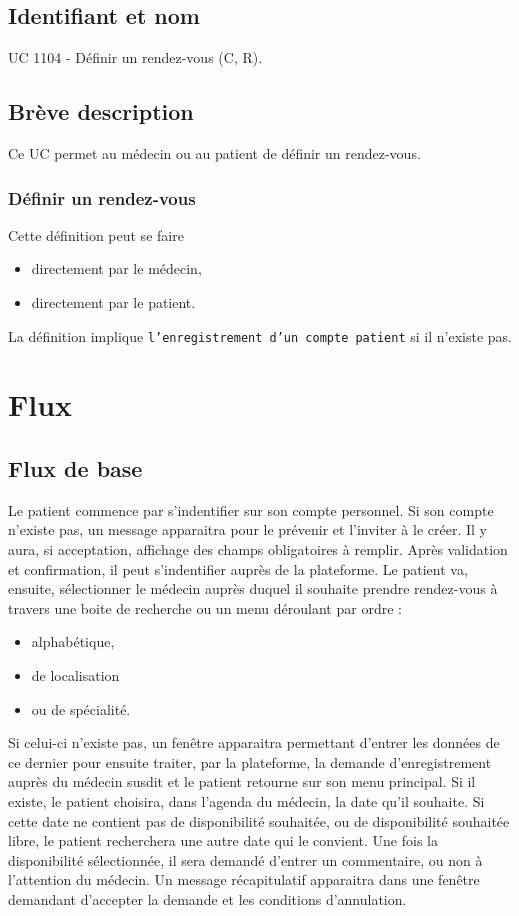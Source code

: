 \subsection{Identifiant et nom}
UC 1104 - Définir un rendez-vous (C, R).
\subsection{Brève description}
Ce UC permet au médecin ou au patient de définir un rendez-vous.
\subsubsection{Définir un rendez-vous}
Cette définition peut se faire
\begin{itemize}
	\item directement par le médecin,
	\item directement par le patient.
\end{itemize}

La définition implique \texttt{l'enregistrement d'un compte patient} si il n'existe pas.
\newpage

\section{Flux}
\subsection{Flux de base}
Le patient commence par s'indentifier sur son compte personnel. 
Si son compte n'existe pas, un message apparaitra pour le prévenir et l'inviter
à le créer. Il y aura, si acceptation, affichage des champs obligatoires à
remplir. Après validation et confirmation, il peut s'indentifier auprès de la plateforme.
Le patient va, ensuite, sélectionner le médecin auprès duquel il souhaite
prendre rendez-vous à travers une boite de recherche ou un menu déroulant par
ordre :
\begin{itemize}
	\item alphabétique,
	\item de localisation
	\item ou de spécialité.
\end{itemize}

Si celui-ci n'existe pas, un fenêtre apparaitra permettant d'entrer les données 
de ce dernier pour ensuite traiter, par la plateforme, la
demande d'enregistrement auprès du médecin susdit et le patient retourne sur
son menu principal.
Si il existe, le patient choisira, dans l'agenda du médecin, la date qu'il
souhaite. Si cette date ne contient pas de disponibilité souhaitée, ou de
disponibilité souhaitée libre, le patient recherchera une autre date qui le 
convient.
Une fois la disponibilité sélectionnée, il sera demandé d'entrer un commentaire,
ou non à l'attention du médecin. Un message récapitulatif apparaitra dans une
fenêtre demandant d'accepter la demande et les conditions d'annulation.


